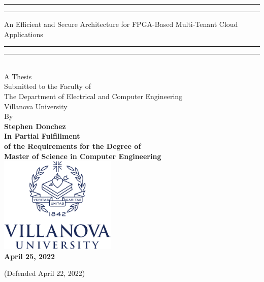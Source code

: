 \begin{titlepage}
    \begingroup

\centering

\sffamily\bfseries\fontsize{24.88}{31.2}\selectfont
\rule{\textwidth}{1.6pt}\vspace*{-\baselineskip}\vspace*{2pt} %
	\rule{\textwidth}{0.4pt} %
	
	\vspace{0.5\baselineskip} %
	An Efficient and Secure Architecture for FPGA-Based Multi-Tenant Cloud Applications

\rule{\textwidth}{1.6pt}\vspace*{-\baselineskip}\vspace*{2pt} %
	\rule{\textwidth}{0.4pt} %
\\[0.4in]
\normalfont\large
A Thesis\\
Submitted to the Faculty of\\
The Department of Electrical and Computer Engineering\\
 Villanova University\\
 \vspace{.2in}
 By
\\
\vspace{0.25in}
\sffamily\bfseries\Large
Stephen Donchez
\\[0.4in]
\normalfont\normalsize
In Partial Fulfillment\\ of the Requirements for the Degree of\\

Master of Science in Computer Engineering
\\[1.5em]
\includegraphics[height=1.8in]{ECE_ReportTemplate/vulogo}\\
[2em]
April 25, 2022

(Defended April 22, 2022)
\par
\endgroup

\end{titlepage}
